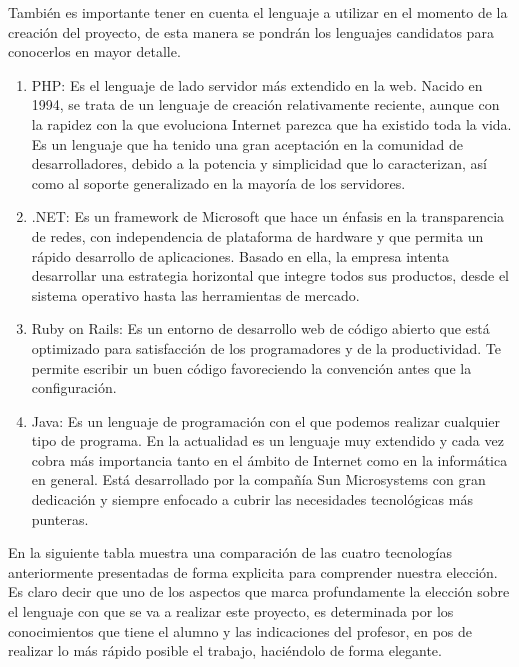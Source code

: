 \documentclass[a4paper,12pt,openany,oneside]{book}
\begin{document}
También es importante tener en cuenta el lenguaje a utilizar en el momento de la creación del proyecto, de esta manera se pondrán los lenguajes candidatos para conocerlos en mayor detalle.

\begin{enumerate}

\item PHP: Es el lenguaje de lado servidor más extendido en la web. Nacido en 1994, se trata de un lenguaje de creación relativamente reciente, aunque con la rapidez con la que evoluciona Internet parezca que ha existido toda la vida. Es un lenguaje que ha tenido una gran aceptación en la comunidad de desarrolladores, debido a la potencia y simplicidad que lo caracterizan, así como al soporte generalizado en la mayoría de los servidores\cite{data7}.

\item .NET: Es un framework de Microsoft que hace un énfasis en la transparencia de redes, con independencia de plataforma de hardware y que permita un rápido desarrollo de aplicaciones. Basado en ella, la empresa intenta desarrollar una estrategia horizontal que integre todos sus productos, desde el sistema operativo hasta las herramientas de mercado\cite{data8}.

\item Ruby on Rails: Es un entorno de desarrollo web de código abierto que está optimizado para satisfacción de los programadores y de la productividad. Te permite escribir un buen código favoreciendo la convención antes que la configuración\cite{data9}.

\item Java: Es un lenguaje de programación con el que podemos realizar cualquier tipo de programa. En la actualidad es un lenguaje muy extendido y cada vez cobra más importancia tanto en el ámbito de Internet como en la informática en general. Está desarrollado por la compañía Sun Microsystems con gran dedicación y siempre enfocado a cubrir las necesidades tecnológicas más punteras\cite{data10}. 
\end{enumerate}

En la siguiente tabla muestra una comparación de las cuatro tecnologías anteriormente presentadas de forma explicita para comprender nuestra elección. Es claro decir que uno de los aspectos que marca profundamente la elección sobre el lenguaje con que se va a realizar este proyecto, es determinada por los conocimientos que tiene el alumno y las indicaciones del profesor, en pos de realizar lo más rápido posible el trabajo, haciéndolo de forma elegante. 
\end{document}
